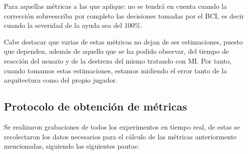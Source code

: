 Para aquellas métricas a las que aplique: no se tendrá en cuenta cuando la
corrección sobreescriba por completo las decisiones tomadas por el BCI, es
decir cuando la severidad de la ayuda sea del 100\%.

Cabe destacar que varias de estas métricas no dejan de ser estimaciones, puesto
que dependen, además de aquello que se ha podido observar, del tiempo de
reacción del usuario y de la destreza del mismo tratando con MI. Por tanto,
cuando tomamos estas estimaciones, estamos midiendo el error tanto de la
arquitectura como del propio jugador.

\subsection{Protocolo de obtención de métricas}
\label{subsec:protocoloObtencionMetricas}

Se realizaron grabaciones de todos los experimentos en tiempo real, de estas se
recolectaron los datos necesarios para el cálculo de las métricas anteriormente
mencionadas, siguiendo las siguientes pautas:

